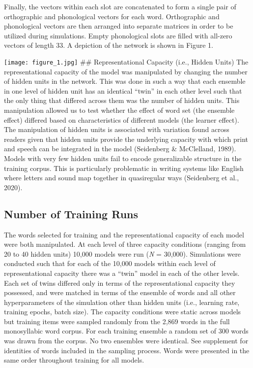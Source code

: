 \documentclass[
  ,man,floatsintext]{apa6}
\begin{document}
Finally, the vectors within each slot are concatenated to form a single pair of orthographic and phonological vectors for each word. Orthographic and phonological vectors are then arranged into separate matrices in order to be utilized during simulations. Empty phonological slots are filled with all-zero vectors of length 33. A depiction of the network is shown in Figure 1.

\texttt{[image: figure\_1.jpg]}
\#\# Representational Capacity (i.e., Hidden Units)
The representational capacity of the model was manipulated by changing the number of hidden units in the network. This was done in such a way that each ensemble in one level of hidden unit has an identical ``twin'' in each other level such that the only thing that differed across them was the number of hidden units. This manipulation allowed us to test whether the effect of word set (the ensemble effect) differed based on characteristics of different models (the learner effect). The manipulation of hidden units is associated with variation found across readers given that hidden units provide the underlying capacity with which print and speech can be integrated in the model (Seidenberg \& McClelland, 1989). Models with very few hidden units fail to encode generalizable structure in the training corpus. This is particularly problematic in writing systems like English where letters and sound map together in quasiregular ways (Seidenberg et al., 2020).

\subsection{Number of Training Runs}\label{number-of-training-runs}

The words selected for training and the representational capacity of each model were both manipulated. At each level of three capacity conditions (ranging from 20 to 40 hidden units) 10,000 models were run (\emph{N} = 30,000). Simulations were conducted such that for each of the 10,000 models within each level of representational capacity there was a ``twin'' model in each of the other levels. Each set of twins differed only in terms of the representational capacity they possessed, and were matched in terms of the ensemble of words and all other hyperparameters of the simulation other than hidden units (i.e., learning rate, training epochs, batch size). The capacity conditions were static across models but training items were sampled randomly from the 2,869 words in the full monosyllabic word corpus. For each training ensemble a random set of 300 words was drawn from the corpus. No two ensembles were identical. See supplement for identities of words included in the sampling process. Words were presented in the same order throughout training for all models.
\end{document}
